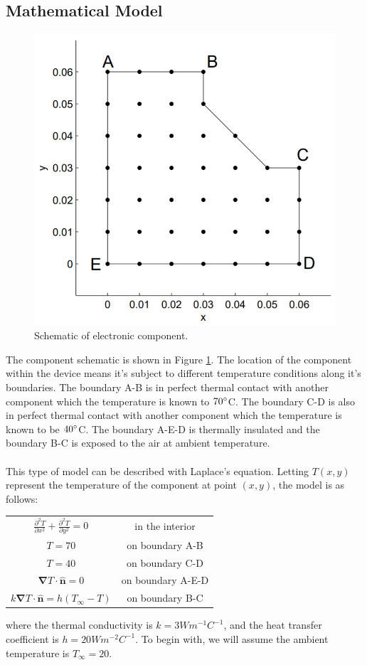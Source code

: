 \documentclass[12pt,a4paper]{article}
\begin{document}
\subsection{Mathematical Model}
\begin{figure}[H]
	\center
	\includegraphics[width=0.9\linewidth]{images/Component.png}
	\caption{Schematic of electronic component.}
	\label{fig:componentSchematic}
\end{figure}
The component schematic is shown in Figure \ref{fig:componentSchematic}. The location of the component within the device means it's subject to different temperature conditions along it's boundaries. The boundary A-B is in perfect thermal contact with another component which the temperature is known to $70\degree$C. The boundary C-D is also in perfect thermal contact with another component which the temperature is known to be $40\degree$C. The boundary A-E-D is thermally insulated and the boundary B-C is exposed to the air at ambient temperature.
\\\\
This type of model can be described with Laplace's equation. Letting $T(x,y)$ represent the temperature of the component at point $(x, y)$, the model is as follows:

\begin{center}
\begin{tabular}{c c}
$\frac{\partial^2 T}{\partial x^2}+\frac{\partial^2 T}{\partial y^2}=0$ & in the interior\\
$T = 70$ & on boundary A-B \\
$T = 40$ & on boundary C-D \\
$\boldsymbol{\nabla} T \cdot {\hat{\textbf{n}}} = 0$ & on boundary A-E-D\\
$k\boldsymbol{\nabla}T\cdot\hat{\textbf{n}} = h(T_{\infty} - T)$ & on boundary B-C
\end{tabular}
\end{center}
where the thermal conductivity is $k=3Wm^{-1}C^{-1}$, and the heat transfer coefficient is $h=20 Wm^{-2}C^{-1}$. To begin with, we will assume the ambient temperature is $T_\infty = 20$.
\clearpage
\end{document}
